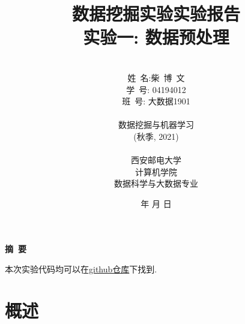 \documentclass[a4paper]{article}
\begin{document}
\renewcommand{\contentsname}{目\ 录}
\renewcommand{\appendixname}{附录}
\renewcommand{\appendixpagename}{附录}
\renewcommand{\refname}{参考文献} 
\renewcommand{\figurename}{图}
\renewcommand{\tablename}{表}
\renewcommand{\today}{\number\year 年 \number\month 月 \number\day 日}

\title{{\Huge 数据挖掘实验实验报告{\large\linebreak\\}}{\Large 实验一: 数据预处理\linebreak\linebreak}}
\author{\\姓\ 名:柴\ 博\ 文\\ 
学\ 号: 04194012\\
班\ 号: 大数据1901\\\\
数据挖掘与机器学习\\
(秋季, 2021)\\\\
西安邮电大学\\
计算机学院\\
数据科学与大数据专业}
\date{\today}
\maketitle
\newpage

\begin{center}
{\Large\bf{摘\ 要\\}}
\end{center}

本次实验代码均可以在\href{https://github.com/lovebaihezi/lab/tree/main/data-process/lab1/julia}{github仓库}下找到.

\newpage
\begin{center}
\tableofcontents\label{c}
\end{center}
\newpage



\section{概述} \label{overview}%

\begin{itemize}
\end{itemize}

\end{document}
